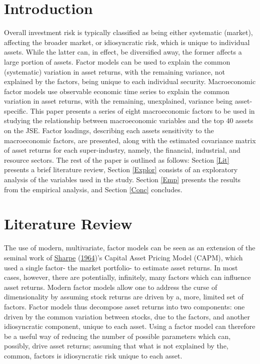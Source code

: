 \documentclass[11pt,preprint, authoryear]{elsarticle}
\numberwithin{equation}{section}
\numberwithin{figure}{section}
\numberwithin{table}{section}
\begin{document}
\hypertarget{introduction}{%
\section{\texorpdfstring{Introduction
\label{Intro}}{Introduction }}\label{introduction}}

Overall investment risk is typically classified as being either
systematic (market), affecting the broader market, or idiosyncratic
risk, which is unique to individual assets. While the latter can, in
effect, be diversified away, the former affects a large portion of
assets. Factor models can be used to explain the common (systematic)
variation in asset returns, with the remaining variance, not explained
by the factors, being unique to each individual security. Macroeconomic
factor models use observable economic time series to explain the common
variation in asset returns, with the remaining, unexplained, variance
being asset-specific. This paper presents a series of eight
macroeconomic factors to be used in studying the relationship between
macroeconomic variables and the top 40 assets on the JSE. Factor
loadings, describing each assets sensitivity to the macroeconomic
factors, are presented, along with the estimated covariance matrix of
asset returns for each super-industry, namely, the financial,
industrial, and resource sectors. The rest of the paper is outlined as
follows: Section \ref{Lit} presents a brief literature review, Section
\ref{Explor} consists of an exploratory analysis of the variables used
in the study. Section \ref{Emp} presents the results from the empirical
analysis, and Section \ref{Conc} concludes.

\hypertarget{literature-review}{%
\section{\texorpdfstring{Literature Review
\label{Lit}}{Literature Review }}\label{literature-review}}

The use of modern, multivariate, factor models can be seen as an
extension of the seminal work of
\protect\hyperlink{ref-Sharpe1964}{Sharpe}
(\protect\hyperlink{ref-Sharpe1964}{1964})'s Capital Asset Pricing Model
(CAPM), which used a single factor- the market portfolio- to estimate
asset returns. In most cases, however, there are potentially,
infinitely, many factors which can influence asset returns. Modern
factor models allow one to address the curse of dimensionality by
assuming stock returns are driven by a, more, limited set of factors.
Factor models thus decompose asset returns into two components: one
driven by the common variation between stocks, due to the factors, and
another idiosyncratic component, unique to each asset. Using a factor
model can therefore be a useful way of reducing the number of possible
parameters which can, possibly, drive asset returns; assuming that what
is not explained by the, common, factors is idiosyncratic risk unique to
each asset.
\end{document}
